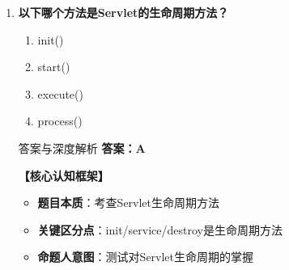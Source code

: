 \documentclass[12pt, a4paper]{ctexart}
\begin{document}
\begin{enumerate}[label=\textbf{\arabic*.}]
\begin{bluebox}{答案与深度解析}
		      \textbf{【应背诵知识点（命题人思维版）】}
		      \begin{enumerate}[leftmargin=*, nosep]
			      \item \textbf{Servlet生命周期}：
			            \begin{enumerate}[label={}, leftmargin=*, nosep]
				            \item 加载：容器加载Servlet类
				            \item 实例化：new Servlet()
				            \item 初始化：init()
				            \item 处理请求：service()
				            \item 销毁：destroy()
			            \end{enumerate}

			      \item \textbf{高频陷阱清单}：
			            \begin{itemize}[label={}, nosep]
				            \item 陷阱1：开发者不直接new Servlet，由容器管理
			            \end{itemize}
		      \end{enumerate}

		      \textbf{【命题趋势与实战策略】}

		      \textbf{考场秒杀技巧}：Servlet由容器管理生命周期
	      \end{bluebox}

	\item \textbf{以下哪个方法是Servlet的生命周期方法？}
	      \begin{enumerate}[label=\Alph*.]
		      \item init()
		      \item start()
		      \item execute()
		      \item process()
	      \end{enumerate}

	      \begin{bluebox}{答案与深度解析}
		      \textbf{答案：A}

		      \textbf{【核心认知框架】}
		      \begin{itemize}[label={}, leftmargin=*, nosep]
			      \item \textbf{题目本质}：考查Servlet生命周期方法
			      \item \textbf{关键区分点}：init/service/destroy是生命周期方法
			      \item \textbf{命题人意图}：测试对Servlet生命周期的掌握
		      \end{itemize}


\end{bluebox}
\end{enumerate}
\end{document}
